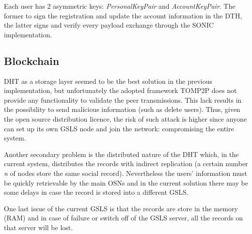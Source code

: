 Each user has 2 asymmetric keys: \textit{PersonalKeyPair} and \textit{AccountKeyPair}. The former to sign the registration and update the account information in the DTH, the latter signs and verify every payload exchange through the SONIC implementation.

\subsection{Blockchain}

DHT as a storage layer seemed to be the best solution in the previous implementation, but unfortunately the adopted framework TOMP2P \cite{tomp2p:2017} does not provide any functionality to validate the peer transmissions. 
This lack results in the possibility to send malicious information (such as delete users).
Thus, given the open source distribution licence, the risk of such attack is higher since anyone can set up its own GSLS node and join the network: compromising the entire system. \par

Another secondary problem is the distributed nature of the DHT which, in the current system, distributes the records with indirect replication \cite{_tomp2p_2017} (a certain number \textit{n} of nodes store the same social record). Nevertheless the users' information must be quickly retrievable by the main OSNs and in the current solution there may be some delays in case the record is stored into a different GSLS. \par

One last issue of the current GSLS is that the records are store in the memory (RAM) and in case of failure or switch off of the GSLS server, all the records on that server will be lost. \par













